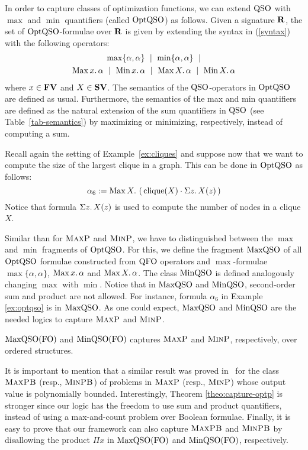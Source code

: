 In order to capture classes of optimization functions, we can extend ${\rm QSO}$ with $\max$ and $\min$ quantifiers (called ${\rm OptQSO}$) as follows. 
Given a signature $\mathbf{R}$, the set of ${\rm OptQSO}$-formulae over $\mathbf{R}$ is given by extending the syntax in (\ref{syntax}) with the following operators:
\begin{multline*}
\max\{\alpha,\alpha\} \ \mid\ \min\{\alpha,\alpha\} \ \mid \\ \maxa{x} \alpha \ \mid \ \mina{x} \alpha \ \mid \ \maxa{X} \alpha \ \mid \ \mina{X} \alpha 
\end{multline*}
where $x \in \mathbf{FV}$ and $X \in \mathbf{SV}$. The semantics of the ${\rm QSO}$-operators in ${\rm OptQSO}$ are defined as usual. Furthermore, the semantics of the max and min quantifiers are defined as the natural extension of the sum quantifiers in ${\rm QSO}$ (see Table~\ref{tab-semantics}) by maximizing or minimizing, respectively, instead of computing a sum. 
\begin{example}\label{ex:optqso}
	Recall again the setting of Example~\ref{ex:cliques} and suppose now that we want to compute the size of the largest clique in a graph. This can be done in ${\rm OptQSO}$ as follows:
	\[
\alpha_6 := \operatorname{Max}{X}.\, \left( \, \operatorname{clique}(X) \cdot \Sigma{z}.\, X(z)  \, \right)
	\]
	Notice that formula $\Sigma{z}.\, X(z)$ is used to compute the number of nodes in a clique $X$. 
\end{example}
Similar than for $\text{\sc MaxP}$ and $\text{\sc MinP}$, we have to distinguished between the $\max$ and $\min$ fragments of ${\rm OptQSO}$. For this, we define the fragment ${\rm MaxQSO}$ of all ${\rm OptQSO}$ formulae constructed from ${\rm QFO}$ operators and $\max$-formulae $\max\{\alpha,\alpha\}$, $\operatorname{Max}{x}.\, \alpha$ and  $\operatorname{Max}{X}.\, \alpha$.
The class ${\rm MinQSO}$ is defined analogously changing $\max$ with $\min$. Notice that in ${\rm MaxQSO}$ and ${\rm MinQSO}$, second-order sum and product are not allowed. For instance, formula $\alpha_6$ in Example \ref{ex:optqso} is in ${\rm MaxQSO}$.
As one could expect, ${\rm MaxQSO}$ and ${\rm MinQSO}$ are the needed logics to capture $\text{\sc MaxP}$ and $\text{\sc MinP}$.
\begin{theorem} \label{theo:capture-optp}
	${\rm MaxQSO}({\rm FO})$ and ${\rm MinQSO}({\rm FO})$ captures $\text{\sc MaxP}$ and $\text{\sc MinP}$, respectively, over ordered structures.
\end{theorem}
It is important to mention that a similar result was proved in~\cite{kolaitis1994logical} for the class $\text{\sc MaxPB}$ (resp., $\text{\sc MinPB}$) of problems in $\text{\sc MaxP}$ (resp., $\text{\sc MinP}$) whose output value is polynomially bounded.
Interestingly, Theorem \ref{theo:capture-optp} is stronger since our logic has the freedom to use sum and product quantifiers, instead of using a max-and-count problem over Boolean formulae. 
Finally, it is easy to prove that our framework can also capture $\text{\sc MaxPB}$ and $\text{\sc MinPB}$ by disallowing the product $\Pi x$ in ${\rm MaxQSO}({\rm FO})$ and ${\rm MinQSO}({\rm FO})$, respectively.

